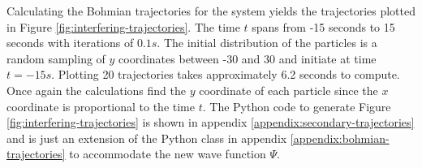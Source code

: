 \documentclass[10pt, reqno]{article}
\begin{document}
  Calculating the Bohmian trajectories for the system yields the trajectories plotted in Figure \ref{fig:interfering-trajectories}.
  The time $t$ spans from -15 seconds to 15 seconds with iterations of $0.1s$.
  The initial distribution of the particles is a random sampling of $y$ coordinates between -30 and 30 and initiate at time $t=-15s$.
  Plotting 20 trajectories takes approximately 6.2 seconds to compute.
  Once again the calculations find the $y$ coordinate of each particle since the $x$ coordinate is proportional to the time $t$.
  The Python code to generate Figure \ref{fig:interfering-trajectories} is shown in appendix \ref{appendix:secondary-trajectories} and is just an 
    extension of the Python class in appendix \ref{appendix:bohmian-trajectories} to accommodate the new wave function $\Psi$.

\end{document}

